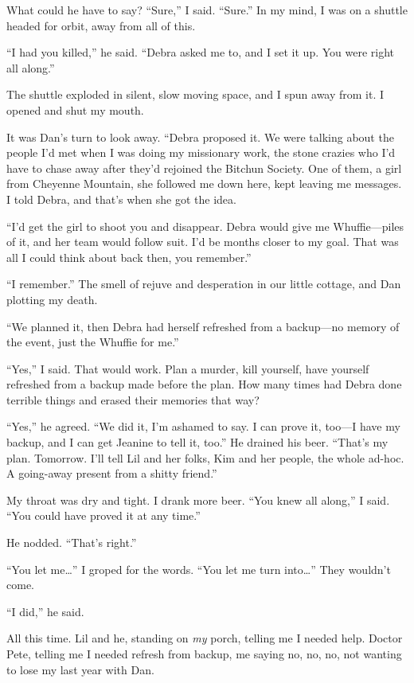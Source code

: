 What could he have to say? “Sure,” I said. “Sure.” In my mind, I
was on a shuttle headed for orbit, away from all of this.

“I had you killed,” he said. “Debra asked me to, and I set it up.
You were right all along.”

The shuttle exploded in silent, slow moving space, and I spun away
from it. I opened and shut my mouth.

It was Dan's turn to look away. “Debra proposed it. We were talking
about the people I'd met when I was doing my missionary work, the
stone crazies who I'd have to chase away after they'd rejoined the
Bitchun Society. One of them, a girl from Cheyenne Mountain, she
followed me down here, kept leaving me messages. I told Debra, and
that's when she got the idea.

“I'd get the girl to shoot you and disappear. Debra would give me
Whuffie—piles of it, and her team would follow suit. I'd be months
closer to my goal. That was all I could think about back then, you
remember.”

“I remember.” The smell of rejuve and desperation in our little
cottage, and Dan plotting my death.

“We planned it, then Debra had herself refreshed from a backup—no
memory of the event, just the Whuffie for me.”

“Yes,” I said. That would work. Plan a murder, kill yourself, have
yourself refreshed from a backup made before the plan. How many
times had Debra done terrible things and erased their memories that
way?

“Yes,” he agreed. “We did it, I'm ashamed to say. I can prove it,
too—I have my backup, and I can get Jeanine to tell it, too.” He
drained his beer. “That's my plan. Tomorrow. I'll tell Lil and her
folks, Kim and her people, the whole ad-hoc. A going-away present
from a shitty friend.”

My throat was dry and tight. I drank more beer. “You knew all
along,” I said. “You could have proved it at any time.”

He nodded. “That's right.”

“You let me…” I groped for the words. “You let me turn into…” They
wouldn't come.

“I did,” he said.

All this time. Lil and he, standing on \emph{my} porch, telling me
I needed help. Doctor Pete, telling me I needed refresh from
backup, me saying no, no, no, not wanting to lose my last year with
Dan.

